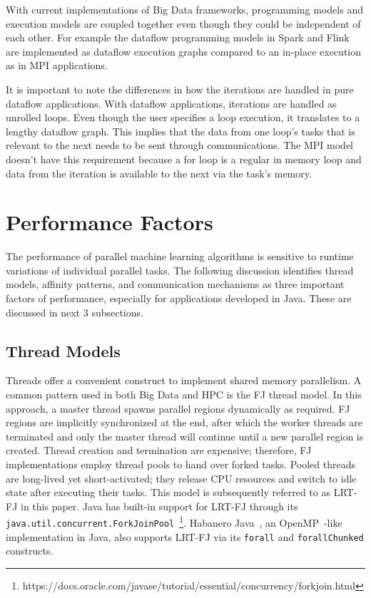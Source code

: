\documentclass[10pt, conference, compsocconf]{IEEEtran}
\begin{document}
With current implementations of Big Data frameworks, programming models and execution models are coupled together even though they could be independent of each other. For example the  dataflow programming models in Spark and Flink are implemented as  dataflow execution graphs compared to an in-place execution as in \ac{MPI} applications.

It is important to note the differences in how the iterations are handled in pure  dataflow applications. With  dataflow applications, iterations are handled as unrolled  loops. Even though the user specifies a  loop execution, it translates to a lengthy dataflow graph. This implies that the data from one loop's tasks that is relevant to the next needs to be sent through communications. The \ac{MPI} model doesn't have this requirement because a for loop is a regular in memory loop  and data from the iteration is available to the next via the task's memory. 

\section{Performance Factors} \label{sec:factors}

The performance of parallel machine learning algorithms is sensitive to runtime variations of individual parallel tasks. The following discussion identifies thread models, affinity patterns, and communication mechanisms as three important factors of performance, especially for applications developed in Java. These are discussed in next 3 subsections.

\subsection{Thread Models}
Threads offer a convenient construct to implement shared memory parallelism. A common pattern used in both Big Data and \ac{HPC} is the \ac{FJ} thread model. In this approach, a master thread spawns parallel regions dynamically as required. \ac{FJ} regions are implicitly synchronized at the end, after which the worker threads are terminated and only the master thread will continue until a new parallel region is created. Thread creation and termination are expensive; therefore, \ac{FJ} implementations employ thread pools to hand over forked tasks. Pooled threads are long-lived yet short-activated; they release \acs{CPU} resources and switch to idle state after executing their tasks. This model is subsequently referred to as \ac{LRT-FJ} in this paper. Java has built-in support for \ac{LRT-FJ} through its \texttt{java.util.concurrent.ForkJoinPool}~\footnote{https://docs.oracle.com/javase/tutorial/essential/concurrency/forkjoin.html}. Habanero Java~\cite{Imam:2014:HLJ:2647508.2647514}, an OpenMP~\cite{Dagum:1998:OIA:615255.615542}-like implementation in Java, also supports \ac{LRT-FJ} via its \texttt{forall} and \texttt{forallChunked} constructs.
\end{document}
